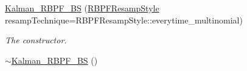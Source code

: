 \begin{DoxyCompactItemize}
\item 
\hyperlink{classKalman__RBPF__BS_aafe2ff44ff6a1b12f5843d4596e0fa13}{Kalman\+\_\+\+R\+B\+P\+F\+\_\+\+BS} (\hyperlink{kalman__rbpf__bs_8h_ad3790b392be9413a27de33728aad31e2}{R\+B\+P\+F\+Resamp\+Style} resamp\+Technique=R\+B\+P\+F\+Resamp\+Style\+::everytime\+\_\+multinomial)
\begin{DoxyCompactList}\small\item\em The constructor. \end{DoxyCompactList}\item 
\hyperlink{classKalman__RBPF__BS_addf3730ab56740f7247835aaa62c018c}{$\sim$\+Kalman\+\_\+\+R\+B\+P\+F\+\_\+\+BS} ()\hypertarget{classKalman__RBPF__BS_addf3730ab56740f7247835aaa62c018c}{}\label{classKalman__RBPF__BS_addf3730ab56740f7247835aaa62c018c}


\end{DoxyCompactItemize}
